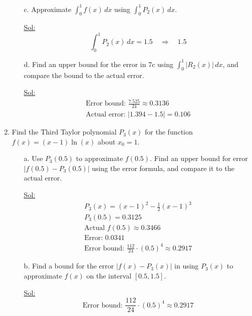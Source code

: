 \begin{enumerate}
\begin{itemize}
    \item[c.] Approximate \( \int_0^1 f(x) \, dx \) using \( \int_0^1
      P_2(x) \, dx \).

      \underline{Sol:}\\
      \[
        \int_0^1 P_2(x) \, dx = 1.5 \quad \Rightarrow \quad 1.5
      \]
      \bigbreak

    \item[d.] Find an upper bound for the error in 7c using \(
      \int_0^1 |R_2(x)| \, dx \), and compare the bound to the actual error.

      \underline{Sol:}\\
      \[
        \begin{array}{l}
          \textrm{Error bound: } \frac{7.525}{24} \approx 0.3136 \\
          \textrm{Actual error: } |1.394 - 1.5| = 0.106
        \end{array}
      \]
      \bigbreak
  \end{itemize}

\item Find the Third Taylor polynomial \( P_3(x) \) for the function
  \( f(x) = (x-1) \ln(x) \) about \( x_0 = 1 \).

  \begin{itemize}
    \item[a.] Use \( P_3(0.5) \) to approximate \( f(0.5) \). Find an
      upper bound for error \( |f(0.5) - P_3(0.5)| \) using the error
      formula, and compare it to the actual error.

      \underline{Sol:}\\
      \[
        \begin{array}{l}
          P_3(x) = (x-1)^2 - \frac{1}{2}(x-1)^3 \\
          P_3(0.5) = 0.3125 \\
          \textrm{Actual } f(0.5) \approx 0.3466 \\
          \textrm{Error: } 0.0341 \\
          \textrm{Error bound: } \frac{112}{24} \cdot (0.5)^4 \approx 0.2917
        \end{array}
      \]
      \bigbreak

    \item[b.] Find a bound for the error \( |f(x) - P_3(x)| \) in
      using \( P_3(x) \) to approximate \( f(x) \) on the interval
      \([0.5, 1.5]\).

      \underline{Sol:}\\
      \[
        \textrm{Error bound: } \frac{112}{24} \cdot (0.5)^4 \approx 0.2917
      \]
      \bigbreak


\end{itemize}
\end{enumerate}

